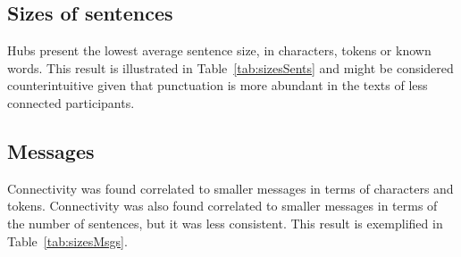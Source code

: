 

																																												\subsection{Sizes of sentences}\label{subsec:ss}
																																												Hubs present the lowest average sentence size,
																																												in characters, tokens or known words.
																																												This result is illustrated in Table~\ref{tab:sizesSents}
																																												and might be considered counterintuitive given that punctuation
																																												is more abundant in the texts of less connected participants.
																																												
																																												\FloatBarrier

																																												\subsection{Messages}\label{subsec:mm}
																																												Connectivity was found correlated to smaller messages in terms of characters and tokens.
																																												Connectivity was also found correlated to smaller messages in terms of the number of sentences, but
																																												it was less consistent.
																																												This result is exemplified in Table~\ref{tab:sizesMsgs}.
																																												
																																												\FloatBarrier



